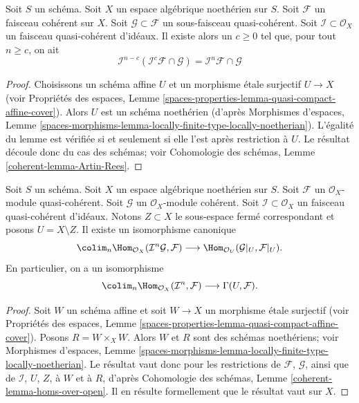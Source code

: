 \begin{lemma}
\label{lemma-Artin-Rees}
Soit $S$ un schéma. Soit $X$ un espace algébrique noethérien sur $S$.
Soit $\mathcal{F}$ un faisceau cohérent sur $X$. Soit
$\mathcal{G} \subset \mathcal{F}$ un sous-faisceau quasi-cohérent.
Soit $\mathcal{I} \subset \mathcal{O}_X$ un faisceau quasi-cohérent
d'idéaux. Il existe alors un $c \geq 0$ tel que, pour tout $n \geq c$, on
ait
$$
\mathcal{I}^{n - c}(\mathcal{I}^c\mathcal{F} \cap \mathcal{G})
=
\mathcal{I}^n\mathcal{F} \cap \mathcal{G}
$$
\end{lemma}

\begin{proof}
Choisissons un schéma affine $U$ et un morphisme \'etale surjectif $U \to X$
(voir Propriétés des espaces, Lemme
\ref{spaces-properties-lemma-quasi-compact-affine-cover}).
Alors $U$ est un schéma noethérien (d'après
Morphismes d'espaces, Lemme
\ref{spaces-morphisms-lemma-locally-finite-type-locally-noetherian}).
L'égalité du lemme est vérifiée si et seulement si elle l'est après
restriction à $U$. Le résultat découle donc du cas des schémas; voir
Cohomologie des schémas, Lemme \ref{coherent-lemma-Artin-Rees}.
\end{proof}

\begin{lemma}
\label{lemma-homs-over-open}
Soit $S$ un schéma. Soit $X$ un espace algébrique noethérien sur $S$.
Soit $\mathcal{F}$ un $\mathcal{O}_X$-module quasi-cohérent.
Soit $\mathcal{G}$ un $\mathcal{O}_X$-module cohérent.
Soit $\mathcal{I} \subset \mathcal{O}_X$ un faisceau quasi-cohérent
d'idéaux. Notons $Z \subset X$ le sous-espace fermé correspondant et
posons $U = X \setminus Z$. Il existe un isomorphisme canonique
$$
\colim_n \Hom_{\mathcal{O}_X}(\mathcal{I}^n\mathcal{G}, \mathcal{F})
\longrightarrow
\Hom_{\mathcal{O}_U}(\mathcal{G}|_U, \mathcal{F}|_U).
$$
En particulier, on a un isomorphisme
$$
\colim_n \Hom_{\mathcal{O}_X}(\mathcal{I}^n, \mathcal{F})
\longrightarrow
\Gamma(U, \mathcal{F}).
$$
\end{lemma}

\begin{proof}
Soit $W$ un schéma affine et soit $W \to X$ un morphisme \'etale
surjectif (voir Propriétés des espaces, Lemme
\ref{spaces-properties-lemma-quasi-compact-affine-cover}).
Posons $R = W \times_X W$. Alors $W$ et $R$ sont des schémas noethériens; voir
Morphismes d'espaces, Lemme
\ref{spaces-morphisms-lemma-locally-finite-type-locally-noetherian}.
Le résultat vaut donc pour les restrictions de $\mathcal{F}$, $\mathcal{G}$,
ainsi que de $\mathcal{I}$, $U$, $Z$, à $W$ et à $R$, d'après
Cohomologie des schémas, Lemme \ref{coherent-lemma-homs-over-open}.
Il en résulte formellement que le résultat vaut sur $X$.
\end{proof}






